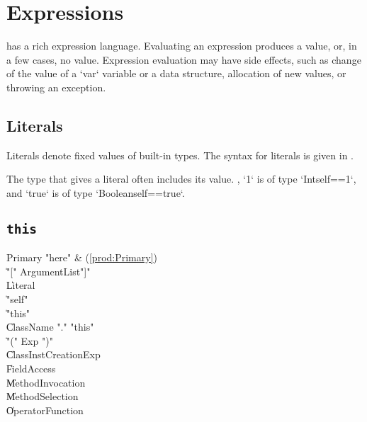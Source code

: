 \chapter{Expressions}\label{XtenExpressions}

\Xten{} has a rich expression language.
Evaluating an expression produces a value, or, in a few cases, no value. 
Expression evaluation may have side effects, such as change of the value of a 
\xcd`var` variable or a data structure, allocation of new values, or throwing
an exception. 


\section{Literals}

Literals denote fixed values of built-in types. 
The syntax for literals is given in . 

The type that \Xten{} gives a literal often includes its value. \Eg, \xcd`1`
is of type \xcd`Int{self==1}`, and \xcd`true` is of type
\xcd`Boolean{self==true}`.

\section{{\tt this}}

\begin{bbgrammar}
             Primary \: \xcd"here" & (\ref{prod:Primary}) \\
                    \| \xcd"[" ArgumentList\opt \xcd"]" \\
                    \| Literal \\
                    \| \xcd"self" \\
                    \| \xcd"this" \\
                    \| ClassName \xcd"." \xcd"this" \\
                    \| \xcd"(" Exp \xcd")" \\
                    \| ClassInstCreationExp \\
                    \| FieldAccess \\
                    \| MethodInvocation \\
                    \| MethodSelection \\
                    \| OperatorFunction \\
\end{bbgrammar}

